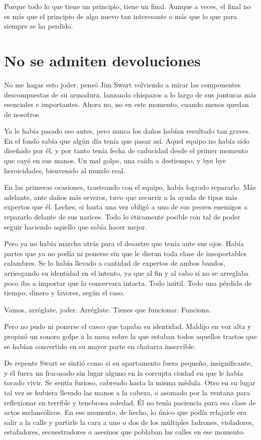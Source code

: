 Porque todo lo que tiene un principio, tiene un final. Aunque a veces, el final no es más que el principio de algo nuevo tan interesante o más que lo que para siempre se ha perdido.
 
\fancyparbreak
\section*{No se admiten devoluciones}

No me hagas esto joder, pensó Jim Swart volviendo a mirar las componentes descompuestas de su armadura, lanzando chispazos a lo largo de sus junturas más esenciales e importantes. Ahora no, no en este momento, cuando menos quedan de nosotros.

Ya le había pasado eso antes, pero nunca los daños habían resultado tan graves. En el fondo sabía que algún día tenía que pasar así. Aquel equipo no había sido diseñado por él, y por tanto tenía fecha de caducidad desde el primer momento que cayó en sus manos. Un mal golpe, una caída a destiempo, y bye bye heroicidades, bienvenido al mundo real.

En las primeras ocasiones, trasteando con el equipo, había logrado repararlo. Más adelante, ante daños más severos, tuvo que recurrir a la ayuda de tipos más expertos que él. Leches, si hasta una vez obligó a uno de sus peores enemigos a repararlo delante de sus narices. Todo lo éticamente posible con tal de poder seguir haciendo aquello que sabía hacer mejor.

Pero ya no había marcha atrás para el desastre que tenía ante sus ojos. Había partes que ya no podía ni ponerse sin que le dieran toda clase de insoportables calambres. Se lo había llevado a cantidad de expertos de ambos bandos, arriesgando su identidad en el intento, ya que al fin y al cabo si no se arreglaba poco iba a importar que la conservara intacta. Todo inútil. Todo una pérdida de tiempo, dinero y favores, según el caso.

Vamos, arréglate, joder. Arréglate. Tienes que funcionar. Funciona.

Pero no pudo ni ponerse el casco que tapaba su identidad. Maldijo en voz alta y propinó un sonoro golpe a la mesa sobre la que estaban todos aquellos trastos que se habían convertido en su mayor parte en chatarra inservible.

De repente Swart se sintió como si su apartamento fuera pequeño, insignificante, y él fuera un fracasado sin lugar alguno en la corrupta ciudad en que le había tocado vivir. Se sentía furioso, cabreado hasta la misma médula. Otro en su lugar tal vez se hubiera llevado las manos a la cabeza, o asomado por la ventana para reflexionar en terrible y tenebrosa soledad. Él no tenía paciencia para esa clase de actos melancólicos. En ese momento, de hecho, lo único que podía relajarle era salir a la calle y partirle la cara a uno o dos de los múltiples ladrones, violadores, estafadores, secuestradores o asesinos que poblaban las calles en ese momento.

